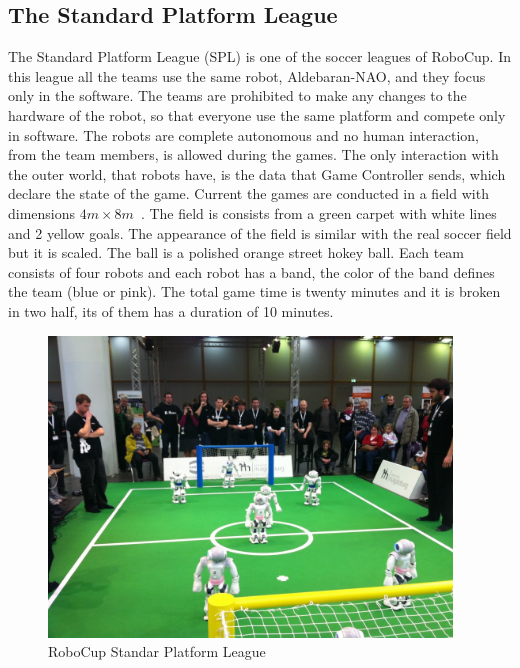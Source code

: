 \subsection{The Standard Platform League}
The Standard Platform League (SPL) is one of the soccer leagues of RoboCup. In this league all the teams use the same robot, Aldebaran-NAO, and they focus only in the software. The teams are prohibited to make any changes to the hardware of the robot, so that everyone use the same platform and compete only in software. The robots are complete autonomous and no human interaction, from the team members, is allowed during the games. The only interaction with the outer world, that robots have, is the data that Game Controller sends, which declare the state of the game.
Current the games are conducted in a field with dimensions \(4m \times 8m\)~\cite{SPLrules2012}. The field is consists from a green carpet with white lines and 2 yellow goals. The appearance of the field is similar with the real soccer field but it is scaled. The ball is a polished orange street hokey ball. Each team consists of four robots and each robot has a band, the color of the band defines the team (blue or pink). The total game time is twenty minutes and it is broken in two half, its of them has a duration of 10 minutes.
\begin{figure}[h]
	\begin{center}
		\includegraphics[height = 8cm]{Figures/RoboCupSpl.jpg}
 		\caption{RoboCup Standar Platform League}
 		\label{fig:RoboCup SPL}
	\end{center}
\end{figure}

